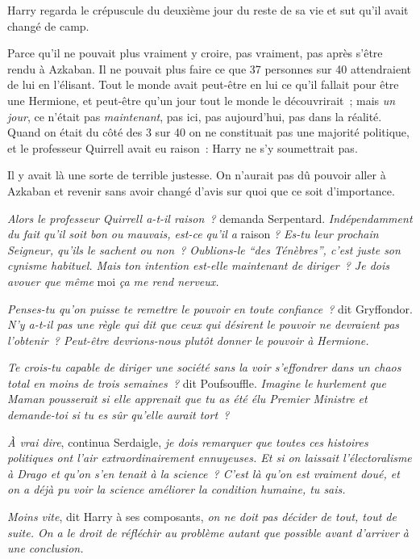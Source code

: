 Harry regarda le crépuscule du deuxième jour du reste de sa vie et sut qu'il avait changé de camp.

Parce qu'il ne pouvait plus vraiment y croire, pas vraiment, pas après s'être rendu à Azkaban. Il ne pouvait plus faire ce que 37 personnes sur 40 attendraient de lui en l'élisant. Tout le monde avait peut-être en lui ce qu'il fallait pour être une Hermione, et peut-être qu'un jour tout le monde le découvrirait~; mais \emph{un jour}, ce n'était pas \emph{maintenant}, pas ici, pas aujourd'hui, pas dans la réalité. Quand on était du côté des 3 sur 40 on ne constituait pas une majorité politique, et le professeur Quirrell avait eu raison~: Harry ne s'y soumettrait pas.

Il y avait là une sorte de terrible justesse. On n'aurait pas dû pouvoir aller à Azkaban et revenir sans avoir changé d'avis sur quoi que ce soit d'importance.

\emph{Alors le professeur Quirrell a-t-il raison~?} demanda Serpentard. \emph{Indépendamment du fait qu'il soit bon ou mauvais, est-ce qu'il a} raison \emph{? Es-tu leur prochain Seigneur, qu'ils le sachent ou non~? Oublions-le “des Ténèbres”, c'est juste son cynisme habituel. Mais ton intention est-elle maintenant de diriger~? Je dois avouer que même} moi \emph{ça me rend nerveux.}

\emph{Penses-tu qu'on puisse te remettre le pouvoir en toute confiance~?} dit Gryffondor. \emph{N'y a-t-il pas une règle qui dit que ceux qui désirent le pouvoir ne devraient pas l'obtenir~? Peut-être devrions-nous plutôt donner le pouvoir à Hermione.}

\emph{Te crois-tu capable de diriger une société sans la voir s'effondrer dans un chaos total en moins de trois semaines~?} dit Poufsouffle. \emph{Imagine le hurlement que Maman pousserait si elle apprenait que tu as été élu Premier Ministre et demande-toi si tu es sûr qu'elle aurait tort~?}

\emph{À vrai dire}, continua Serdaigle, \emph{je dois remarquer que toutes ces histoires politiques ont l'air extraordinairement ennuyeuses. Et si on laissait l'électoralisme à Drago et qu'on s'en tenait à la science~? C'est là qu'on est vraiment doué, et on a déjà pu voir la science améliorer la condition humaine, tu sais.}

\emph{Moins vite}, dit Harry à ses composants, \emph{on ne doit pas décider de tout, tout de suite. On a le droit de réfléchir au problème autant que possible avant d'arriver à une conclusion.}

